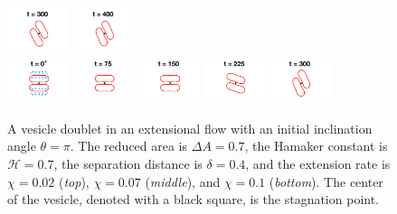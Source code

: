 \documentclass[prf,superscriptaddress,showkeys,longbibliography]{revtex4-1}
\begin{document}
\begin{figure}[htp]
  \includegraphics[width = 0.16\textwidth,trim={4cm 2cm 4cm 1cm},clip]{figs/extensional_adR4em1adS7em1Chi7em2_ra070_image04.png}
  \includegraphics[width = 0.16\textwidth,trim={4cm 2cm 4cm 1cm},clip]{figs/extensional_adR4em1adS7em1Chi7em2_ra070_image05.png} \\
  \includegraphics[width = 0.16\textwidth,trim={4cm 2cm 4cm 1cm},clip]{figs/extensional_adR4em1adS7em1Chi1em1_ra070_image01.png}
  \includegraphics[width = 0.16\textwidth,trim={4cm 2cm 4cm 1cm},clip]{figs/extensional_adR4em1adS7em1Chi1em1_ra070_image02.png}
  \includegraphics[width = 0.16\textwidth,trim={4cm 2cm 4cm 1cm},clip]{figs/extensional_adR4em1adS7em1Chi1em1_ra070_image03.png}
  \includegraphics[width = 0.16\textwidth,trim={4cm 2cm 4cm 1cm},clip]{figs/extensional_adR4em1adS7em1Chi1em1_ra070_image04.png}
  \includegraphics[width = 0.16\textwidth,trim={4cm 2cm 4cm 1cm},clip]{figs/extensional_adR4em1adS7em1Chi1em1_ra070_image05.png}
  \caption{\label{fig:extensional1} A vesicle doublet in an extensional
  flow with an initial inclination angle $\theta=\pi$.  The reduced
  area is $\Delta A = 0.7$, the Hamaker constant is $\mathcal{H} = 0.7$,
  the separation distance is $\delta = 0.4$, and the extension rate is
  $\chi = 0.02$ ({\em top}), $\chi=0.07$ ({\em middle}), and $\chi =
  0.1$ ({\em bottom}).  The center of the vesicle, denoted with a black
  square, is the stagnation point.}
  \end{figure}
\end{document}

